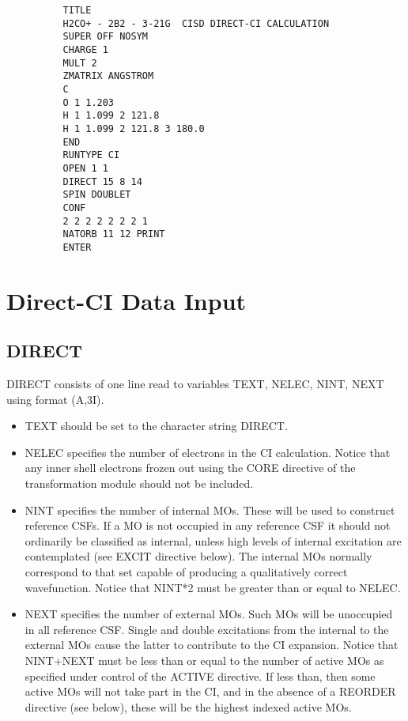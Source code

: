 \documentclass[11pt,fleqn]{article}
\begin{document}
{
\footnotesize
\begin{verbatim}
          TITLE
          H2CO+ - 2B2 - 3-21G  CISD DIRECT-CI CALCULATION
          SUPER OFF NOSYM
          CHARGE 1
          MULT 2
          ZMATRIX ANGSTROM
          C
          O 1 1.203
          H 1 1.099 2 121.8
          H 1 1.099 2 121.8 3 180.0
          END
          RUNTYPE CI
          OPEN 1 1
          DIRECT 15 8 14
          SPIN DOUBLET
          CONF
          2 2 2 2 2 2 2 1
          NATORB 11 12 PRINT
          ENTER

\end{verbatim}
}

\section[Direct-CI Data Input]{Direct-CI Data Input}

\subsection[DIRECT]{DIRECT}

DIRECT consists of one line read to variables TEXT, NELEC, NINT, NEXT using
format (A,3I).
\begin{itemize}
\item TEXT should be set to the character string DIRECT.
\item  NELEC specifies the number of electrons in the CI calculation.
Notice that any inner shell electrons frozen out using the
CORE directive of the transformation module  should not
be included.
\item  NINT specifies the number of internal MOs. These will be used to
construct reference CSFs. If a MO is not occupied
in any reference CSF it should not ordinarily be classified
as internal, unless high levels of internal excitation are contemplated
(see EXCIT directive below).
The internal MOs normally correspond to that set capable of producing
a qualitatively correct wavefunction.
Notice that NINT*2 must be greater than or equal
to NELEC.
\item  NEXT specifies the number of external MOs. Such MOs will be
unoccupied in all reference CSF. Single and double
excitations from the internal to the external MOs cause
the latter to contribute to the CI expansion.
Notice that NINT+NEXT must be less than or equal to the number of
active MOs as specified under control of the ACTIVE directive.
If less than, then some active MOs will not take part in the CI,
and in the absence of a REORDER directive (see below), these will be
the highest indexed active MOs.
\end{itemize}
\end{document}
